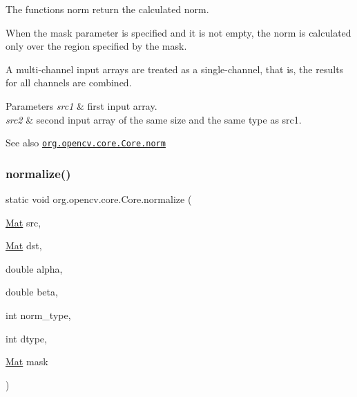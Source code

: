 The functions {\ttfamily norm} return the calculated norm.

When the {\ttfamily mask} parameter is specified and it is not empty, the norm is calculated only over the region specified by the mask.

A multi-\/channel input arrays are treated as a single-\/channel, that is, the results for all channels are combined.


\begin{DoxyParams}{Parameters}
{\em src1} & first input array. \\
\hline
{\em src2} & second input array of the same size and the same type as {\ttfamily src1}.\\
\hline
\end{DoxyParams}
\begin{DoxySeeAlso}{See also}
\href{http://docs.opencv.org/modules/core/doc/operations_on_arrays.html#norm}{\tt org.\+opencv.\+core.\+Core.\+norm} 
\end{DoxySeeAlso}
\mbox{\label{classorg_1_1opencv_1_1core_1_1_core_a10833c4c941f13d93e3c5e702efa482e}} 
\subsubsection{\texorpdfstring{normalize()}{normalize()}\hspace{0.1cm}{\footnotesize\ttfamily [1/4]}}
{\footnotesize\ttfamily static void org.\+opencv.\+core.\+Core.\+normalize (\begin{DoxyParamCaption}\item[{\mbox{\hyperlink{classorg_1_1opencv_1_1core_1_1_mat}{Mat}}}]{src,  }\item[{\mbox{\hyperlink{classorg_1_1opencv_1_1core_1_1_mat}{Mat}}}]{dst,  }\item[{double}]{alpha,  }\item[{double}]{beta,  }\item[{int}]{norm\+\_\+type,  }\item[{int}]{dtype,  }\item[{\mbox{\hyperlink{classorg_1_1opencv_1_1core_1_1_mat}{Mat}}}]{mask }\end{DoxyParamCaption})\hspace{0.3cm}{\ttfamily [static]}}

